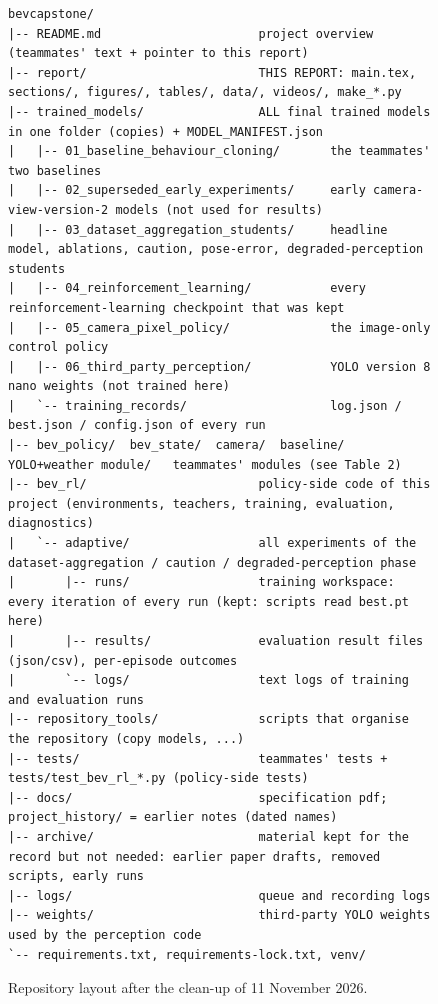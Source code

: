 \begin{figure}[H]
\small
\begin{lstlisting}[frame=single,basicstyle=\ttfamily\scriptsize]
bevcapstone/
|-- README.md                      project overview (teammates' text + pointer to this report)
|-- report/                        THIS REPORT: main.tex, sections/, figures/, tables/, data/, videos/, make_*.py
|-- trained_models/                ALL final trained models in one folder (copies) + MODEL_MANIFEST.json
|   |-- 01_baseline_behaviour_cloning/       the teammates' two baselines
|   |-- 02_superseded_early_experiments/     early camera-view-version-2 models (not used for results)
|   |-- 03_dataset_aggregation_students/     headline model, ablations, caution, pose-error, degraded-perception students
|   |-- 04_reinforcement_learning/           every reinforcement-learning checkpoint that was kept
|   |-- 05_camera_pixel_policy/              the image-only control policy
|   |-- 06_third_party_perception/           YOLO version 8 nano weights (not trained here)
|   `-- training_records/                    log.json / best.json / config.json of every run
|-- bev_policy/  bev_state/  camera/  baseline/  YOLO+weather module/   teammates' modules (see Table 2)
|-- bev_rl/                        policy-side code of this project (environments, teachers, training, evaluation, diagnostics)
|   `-- adaptive/                  all experiments of the dataset-aggregation / caution / degraded-perception phase
|       |-- runs/                  training workspace: every iteration of every run (kept: scripts read best.pt here)
|       |-- results/               evaluation result files (json/csv), per-episode outcomes
|       `-- logs/                  text logs of training and evaluation runs
|-- repository_tools/              scripts that organise the repository (copy models, ...)
|-- tests/                         teammates' tests + tests/test_bev_rl_*.py (policy-side tests)
|-- docs/                          specification pdf; project_history/ = earlier notes (dated names)
|-- archive/                       material kept for the record but not needed: earlier paper drafts, removed scripts, early runs
|-- logs/                          queue and recording logs
|-- weights/                       third-party YOLO weights used by the perception code
`-- requirements.txt, requirements-lock.txt, venv/
\end{lstlisting}
\caption{Repository layout after the clean-up of 11 November 2026.}\label{fig:tree}
\end{figure}

